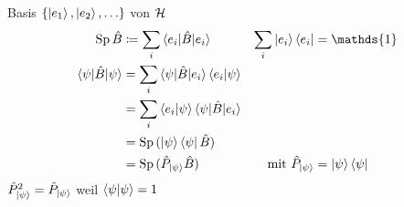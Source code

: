 	Basis $\{\ket{e_1}, \ket{e_2}, \ldots \}$ von $\mathcal{H}$
		\begin{align*}
			\mathrm{Sp}\, \hat{B} &\coloneqq \sum_i \braket{e_i | \hat{B} | e_i} &
			\sum_i \ket{e_i} \bra{e_i} &= \mathds{1} \\
			\braket{\psi| \hat{B} | \psi} &= 
			\sum_i \braket{\psi | \hat{B} | e_i} \braket{e_i | \psi} \\
			&= \sum_i \braket{e_i | \psi} \braket{\psi | \hat{B} | e_i} \\
			&= \mathrm{Sp}\,(\ket{\psi} \bra{\psi} \hat{B}) \\
			&= \mathrm{Sp}\, (\hat{P}_{\ket{\psi}} \hat{B}) &
			\text{mit } \hat{P}_{\ket{\psi}} &= \ket{\psi} \bra{\psi} 
		\end{align*}
	$\hat{P}^2_{\ket{\psi}} =\hat{P}_{\ket{\psi}}$ weil $\braket{\psi | \psi} = 1$
	
